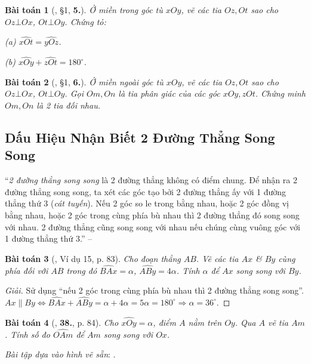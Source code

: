 \documentclass{article}
\numberwithin{equation}{section}
\newtheorem{baitoan}{Bài toán}[section]
\begin{document}
\begin{baitoan}[\cite{Binh_Toan_7_tap_1}, \S1, \textbf{5.}]
	Ở miền trong góc tù $xOy$, vẽ các tia $Oz,Ot$ sao cho $Oz\bot Ox$, $Ot\bot Oy$. Chứng tỏ:
	\begin{enumerate*}
		\item[(a)] $\widehat{xOt} = \widehat{yOz}$.
		\item[(b)] $\widehat{xOy} + \widehat{zOt} = 180^\circ$.
	\end{enumerate*}
\end{baitoan}

\begin{baitoan}[\cite{Binh_Toan_7_tap_1}, \S1, \textbf{6.}]
	Ở miền ngoài góc tù $xOy$, vẽ các tia $Oz,Ot$ sao cho $Oz\bot Ox$, $Ot\bot Oy$. Gọi $Om,On$ là tia phân giác của các góc $xOy,zOt$. Chứng minh $Om,On$ là 2 tia đối nhau.
\end{baitoan}


\subsection{Dấu Hiệu Nhận Biết 2 Đường Thẳng Song Song}
``\textit{2 đường thẳng song song} là 2 đường thẳng không có điểm chung. Để nhận ra 2 đường thẳng song song, ta xét các góc tạo bởi 2 đường thẳng ấy với 1 đường thẳng thứ 3 (\textit{cát tuyến}). Nếu 2 góc so le trong bằng nhau, hoặc 2 góc đồng vị bằng nhau, hoặc 2 góc trong cùng phía bù nhau thì 2 đường thẳng đó song song với nhau. 2 đường thẳng cũng song song với nhau nếu chúng cùng vuông góc với 1 đường thẳng thứ 3.'' -- \cite[\S6, p. 83]{Binh_Toan_7_tap_1}

\begin{baitoan}[\cite{Binh_Toan_7_tap_1}, Ví dụ 15, p. 83]
	Cho đoạn thẳng $AB$. Vẽ các tia $Ax$ \& $By$ cùng phía đối với $AB$ trong đó $\widehat{BAx} = \alpha$, $\widehat{ABy} = 4\alpha$. Tính $\alpha$ để $Ax$ song song với $By$.
\end{baitoan}

\begin{proof}[Giải]
	Sử dụng ``nếu 2 góc trong cùng phía bù nhau thì 2 đường thẳng song song''. $Ax\parallel By\Leftrightarrow\widehat{BAx} + \widehat{ABy} = \alpha + 4\alpha = 5\alpha = 180^\circ\Rightarrow\alpha = 36^\circ$.
\end{proof}

\begin{baitoan}[\cite{Binh_Toan_7_tap_1}, \textbf{38.}, p. 84]
	Cho $\widehat{xOy} = \alpha$, điểm $A$ nằm trên $Oy$. Qua $A$ vẽ tia $Am$. Tính số đo $\widehat{OAm}$ để $Am$ song song với $Ox$.
\end{baitoan}
\textit{Bài tập dựa vào hình vẽ sẵn}: \cite[\textbf{37.}, \textbf{39.}, p. 84, \textbf{44.}, \textbf{45.}, p. 87]{Binh_Toan_7_tap_1}.
\end{document}
